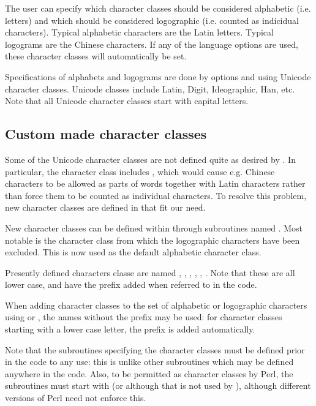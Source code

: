 \documentclass{article}
\begin{document}
The user can specify which character classes should be considered alphabetic (i.e. letters) and which should be considered logographic (i.e. counted as indicidual characters). Typical alphabetic characters are the Latin letters. Typical logograms are the Chinese characters. If any of the language options are used, these character classes will automatically be set.

Specifications of alphabets and logograms are done by options  and  using Unicode character classes. Unicode classes include Latin, Digit, Ideographic, Han, etc. Note that all Unicode character classes start with capital letters.


\subsection{Custom made character classes}

Some of the Unicode character classes are not defined quite as desired by \TeXcount{}. In particular, the  character class includes , which would cause e.g. Chinese characters to be allowed as parts of words together with Latin characters rather than force them to be counted as individual characters. To resolve this problem, new character classes are defined in \TeXcount{} that fit our need.

New character classes can be defined within \TeXcount{} through subroutines named . Most notable is the  character class from which the logographic characters have been excluded. This is now used as the default alphabetic character class.

Presently defined characters classe are named , , , , , . Note that these are all lower case, and have the prefix  added when referred to in the code.

When adding character classes to the set of alphabetic or logographic characters using  or , the names without the prefix  may be used: for character classes starting with a lower case letter, the prefix is added automatically.

Note that the subroutines specifying the character classes must be defined prior in the code to any use: this is unlike other subroutines which may be defined anywhere in the code. Also, to be permitted as character classes by Perl, the subroutines must start with  (or  although that is not used by \TeXcount{}), although different versions of Perl need not enforce this.
\end{document}
